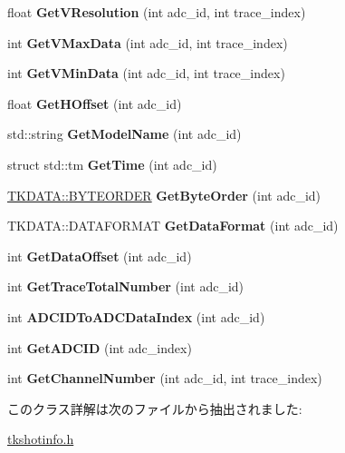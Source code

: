 \begin{DoxyCompactItemize}
float {\bfseries Get\+V\+Resolution} (int adc\+\_\+id, int trace\+\_\+index)
\item 
\mbox{\label{class_t_k_s_h_o_t_aa69c94f494055fd98ff3982681d6795c}} 
int {\bfseries Get\+V\+Max\+Data} (int adc\+\_\+id, int trace\+\_\+index)
\item 
\mbox{\label{class_t_k_s_h_o_t_ab02def889d5bf8c6103dbac2a5f89ab6}} 
int {\bfseries Get\+V\+Min\+Data} (int adc\+\_\+id, int trace\+\_\+index)
\item 
\mbox{\label{class_t_k_s_h_o_t_ae9bd114c4904e0f20929988b4307587f}} 
float {\bfseries Get\+H\+Offset} (int adc\+\_\+id)
\item 
\mbox{\label{class_t_k_s_h_o_t_adb4af221e08781c6f742ff681d134163}} 
std\+::string {\bfseries Get\+Model\+Name} (int adc\+\_\+id)
\item 
\mbox{\label{class_t_k_s_h_o_t_a81a7b45e485313431b6145c884f3926c}} 
struct std\+::tm {\bfseries Get\+Time} (int adc\+\_\+id)
\item 
\mbox{\label{class_t_k_s_h_o_t_acfcfbf59a93120c97de2eee6acec5104}} 
\hyperlink{class_t_k_d_a_t_a_ab55f2c2d1c76bbeb3c1820ad2e749f38}{T\+K\+D\+A\+T\+A\+::\+B\+Y\+T\+E\+O\+R\+D\+ER} {\bfseries Get\+Byte\+Order} (int adc\+\_\+id)
\item 
\mbox{\label{class_t_k_s_h_o_t_a30ef4f11ad37a0e1ab3002d6e7a335d6}} 
T\+K\+D\+A\+T\+A\+::\+D\+A\+T\+A\+F\+O\+R\+M\+AT {\bfseries Get\+Data\+Format} (int adc\+\_\+id)
\item 
\mbox{\label{class_t_k_s_h_o_t_ace4770ac6dcdec71ce95823689a58380}} 
int {\bfseries Get\+Data\+Offset} (int adc\+\_\+id)
\item 
\mbox{\label{class_t_k_s_h_o_t_a45a19a71b5d82762601acef738ad504d}} 
int {\bfseries Get\+Trace\+Total\+Number} (int adc\+\_\+id)
\item 
\mbox{\label{class_t_k_s_h_o_t_a370000c7133ee68afe584d7c74864411}} 
int {\bfseries A\+D\+C\+I\+D\+To\+A\+D\+C\+Data\+Index} (int adc\+\_\+id)
\item 
\mbox{\label{class_t_k_s_h_o_t_a5402cb531f82fe70ba46a4f0d97dfedf}} 
int {\bfseries Get\+A\+D\+C\+ID} (int adc\+\_\+index)
\item 
\mbox{\label{class_t_k_s_h_o_t_a71522d246c17a4643838a01bef2943ff}} 
int {\bfseries Get\+Channel\+Number} (int adc\+\_\+id, int trace\+\_\+index)
\end{DoxyCompactItemize}


このクラス詳解は次のファイルから抽出されました\+:\begin{DoxyCompactItemize}
\item 
\hyperlink{tkshotinfo_8h}{tkshotinfo.\+h}\end{DoxyCompactItemize}
